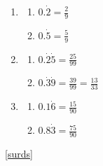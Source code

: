 \documentclass[a4paper,12pt]{article}
\begin{document}
		\begin{multicols}{3}
	\begin{enumerate}
		\item 
		\begin{enumerate}
			\item $\displaystyle 0.\dot{2}=\frac{2}{9}$
			\item $\displaystyle 0.\dot{5}=\frac{5}{9}$
		\end{enumerate}
		\item 
		\begin{enumerate}
			\item $\displaystyle 0.\dot{2}\dot{5}=\frac{25}{99}$
			\item $\displaystyle 0.\dot{3}\dot{9}=\frac{39}{99}=\frac{13}{33}$
		\end{enumerate}
		\item 
		\begin{enumerate}
			\item $\displaystyle 0.1\dot{6}=\frac{15}{90}$
			\item $\displaystyle 0.8\dot{3}=\frac{75}{90}$
		\end{enumerate}
	\end{enumerate}
\end{multicols}
\ref{surds}
\end{document}
